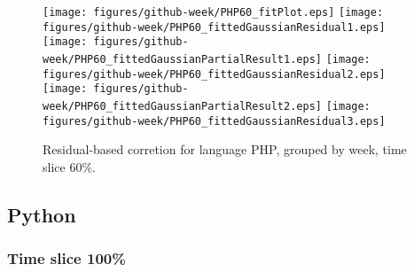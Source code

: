 \begin{figure}[hb]
\centering
{}
{\texttt{[image: figures/github-week/PHP60\_fitPlot.eps]}}
{\texttt{[image: figures/github-week/PHP60\_fittedGaussianResidual1.eps]}}
{\texttt{[image: figures/github-week/PHP60\_fittedGaussianPartialResult1.eps]}}
{\texttt{[image: figures/github-week/PHP60\_fittedGaussianResidual2.eps]}}
{\texttt{[image: figures/github-week/PHP60\_fittedGaussianPartialResult2.eps]}}
{\texttt{[image: figures/github-week/PHP60\_fittedGaussianResidual3.eps]}}
\caption{Residual-based corretion for language PHP, grouped by week, time slice 60\%.}
\end{figure}


\clearpage 
\newpage 


\subsection{Python}

\FloatBarrier

\subsubsection{Time slice 100\%}

